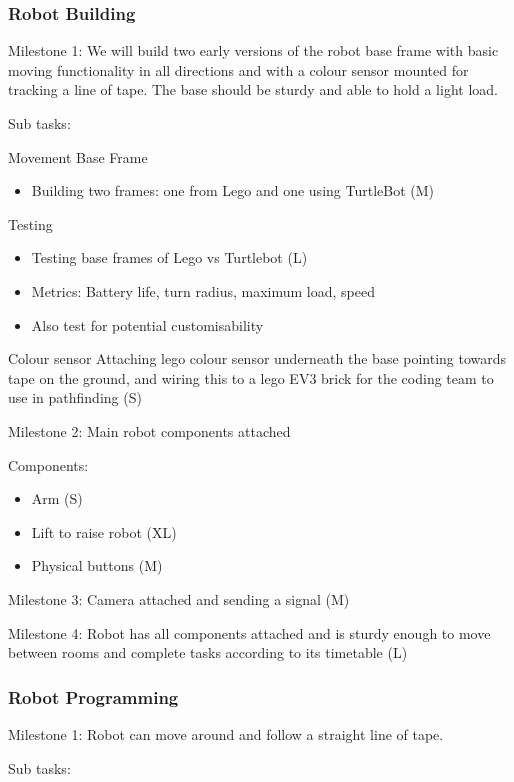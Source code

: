 \documentclass{article}
\begin{document}
\subsubsection{Robot Building}

Milestone 1: We will build two early versions of the robot base frame with basic moving functionality in all directions and with a colour sensor mounted for tracking a line of tape. The base should be sturdy and able to hold a light load. 

Sub tasks:

Movement Base Frame
\begin{itemize}
\item Building two frames: one from Lego and one using TurtleBot (M)
\end{itemize}
Testing
\begin{itemize}
\item Testing base frames of Lego vs Turtlebot (L)
\item Metrics: Battery life, turn radius, maximum load, speed
\item Also test for potential customisability
\end{itemize}
    
Colour sensor
    Attaching lego colour sensor underneath the base pointing towards tape on the ground, and wiring this to a lego EV3 brick for the       coding team to use in pathfinding (S)
    
Milestone 2: Main robot components attached

Components:
\begin{itemize}
\item Arm (S)
\item Lift to raise robot (XL)
\item Physical buttons (M)
\end{itemize}
    
Milestone 3: Camera attached and sending a signal (M)

Milestone 4: Robot has all components attached and is sturdy enough to move between rooms and complete tasks according to its timetable (L) 


\subsubsection{Robot Programming}

Milestone 1: Robot can move around and follow a straight line of tape.

Sub tasks: 
\end{document}
